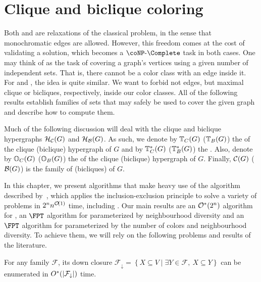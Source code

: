 \section{Clique and biclique coloring}

Both  and  are relaxations of the classical  problem, in the sense that monochromatic edges are allowed.
However, this freedom comes at the cost of validating a solution, which becomes a $\coNP\text{-}\Complete$ task in both cases.
One may think of  as the task of covering a graph's vertices using a given number of independent sets.
That is, there cannot be a color class with an edge inside it.
For  and , the idea is quite similar.
We want to forbid not edges, but maximal clique or bicliques, respectively, inside our color classes.
All of the following results establish families of sets that may safely be used to cover the given graph and describe how to compute them.

Much of the following discussion will deal with the clique and biclique hypergraphs $\mathcal{H}_{\mathcal{C}}(G)$ and $\mathcal{H}_{\mathcal{B}}(G)$.
As such, we denote by $\mathbb{T}_{C}(G)$ ($\mathbb{T}_{B}(G)$) the  of the clique (biclique) hypergraph of $G$ and by $\mathbb{T}^*_{C}(G)$ ($\mathbb{T}^*_{B}(G)$) the .
Also, denote by $\mathbb{O}_{C}(G)$ ($\mathbb{O}_{B}(G)$) the  of the clique (biclique) hypergraph of $G$.
Finally, $\mathcal{C}(G)$ ($\mathcal{B}(G)$) is the family of  (bicliques) of $G$.

In this chapter, we present algorithms that make heavy use of the algorithm described by~\cite{inclusion_exclusion}, which applies the inclusion-exclusion principle to solve a variety of problems in $2^nn^{\mathcal{O}\!\left(1\right)}$ time, including .
Our main results are an $\mathcal{O}^*\!\left(2^n\right)$ algorithm for , an $\FPT$ algorithm for  parameterized by neighbourhood diversity and an $\FPT$ algorithm for  parameterized by the number of colors and neighbourhood diversity.
To achieve them, we will rely on the following problems and results of the literature.

\begin{lemma}
    \label{lem:down_closure}
    For any family $\mathcal{F}$, its down closure $\mathcal{F}_{\downarrow} = \left\{X \subseteq V \mid \exists Y \in \mathcal{F},\ X \subseteq Y\right\}$ can be enumerated in $O^*(|\mathcal{F}_{\downarrow}|)$ time.
\end{lemma}

